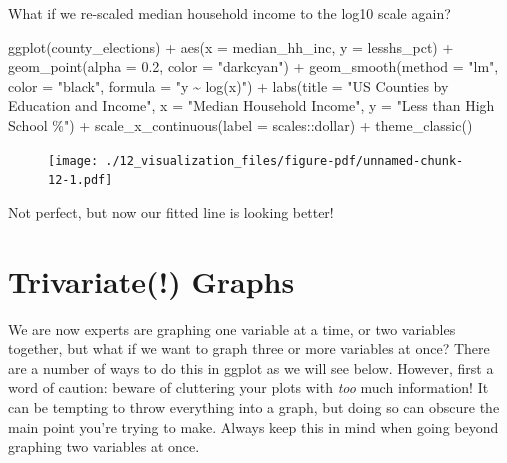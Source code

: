 \documentclass[
  letterpaper,
]{book}
\newenvironment{Shaded}{\begin{snugshade}}{\end{snugshade}}
\newcommand{\AttributeTok}[1]{\textcolor[rgb]{0.40,0.45,0.13}{#1}}
\newcommand{\FloatTok}[1]{\textcolor[rgb]{0.68,0.00,0.00}{#1}}
\newcommand{\FunctionTok}[1]{\textcolor[rgb]{0.28,0.35,0.67}{#1}}
\newcommand{\NormalTok}[1]{\textcolor[rgb]{0.00,0.23,0.31}{#1}}
\newcommand{\SpecialCharTok}[1]{\textcolor[rgb]{0.37,0.37,0.37}{#1}}
\newcommand{\StringTok}[1]{\textcolor[rgb]{0.13,0.47,0.30}{#1}}
\theoremstyle{definition}
\theoremstyle{definition}
\theoremstyle{plain}
\theoremstyle{definition}
\theoremstyle{plain}
\theoremstyle{plain}
\theoremstyle{remark}
\begin{document}
What if we re-scaled median household income to the log10 scale again?

\begin{Shaded}
\begin{Highlighting}[]
\FunctionTok{ggplot}\NormalTok{(county\_elections) }\SpecialCharTok{+}
  \FunctionTok{aes}\NormalTok{(}\AttributeTok{x =}\NormalTok{ median\_hh\_inc, }\AttributeTok{y =}\NormalTok{ lesshs\_pct) }\SpecialCharTok{+}
  \FunctionTok{geom\_point}\NormalTok{(}\AttributeTok{alpha =} \FloatTok{0.2}\NormalTok{, }\AttributeTok{color =} \StringTok{"darkcyan"}\NormalTok{) }\SpecialCharTok{+}
  \FunctionTok{geom\_smooth}\NormalTok{(}\AttributeTok{method =} \StringTok{"lm"}\NormalTok{, }\AttributeTok{color =} \StringTok{"black"}\NormalTok{,}
              \AttributeTok{formula =} \StringTok{"y \textasciitilde{} log(x)"}\NormalTok{) }\SpecialCharTok{+}
  \FunctionTok{labs}\NormalTok{(}\AttributeTok{title =} \StringTok{"US Counties by Education and Income"}\NormalTok{,}
       \AttributeTok{x =} \StringTok{"Median Household Income"}\NormalTok{,}
       \AttributeTok{y =} \StringTok{"Less than High School \%"}\NormalTok{) }\SpecialCharTok{+}
  \FunctionTok{scale\_x\_continuous}\NormalTok{(}\AttributeTok{label =}\NormalTok{ scales}\SpecialCharTok{::}\NormalTok{dollar) }\SpecialCharTok{+}
  \FunctionTok{theme\_classic}\NormalTok{()}
\end{Highlighting}
\end{Shaded}

\begin{figure}[H]

{\centering \texttt{[image: ./12\_visualization\_files/figure-pdf/unnamed-chunk-12-1.pdf]}

}

\end{figure}

Not perfect, but now our fitted line is looking better!

\hypertarget{trivariate-graphs}{%
\section{Trivariate(!) Graphs}\label{trivariate-graphs}}

We are now experts are graphing one variable at a time, or two variables
together, but what if we want to graph three or more variables at once?
There are a number of ways to do this in ggplot as we will see below.
However, first a word of caution: beware of cluttering your plots with
\emph{too} much information! It can be tempting to throw everything into
a graph, but doing so can obscure the main point you're trying to make.
Always keep this in mind when going beyond graphing two variables at
once.
\end{document}
